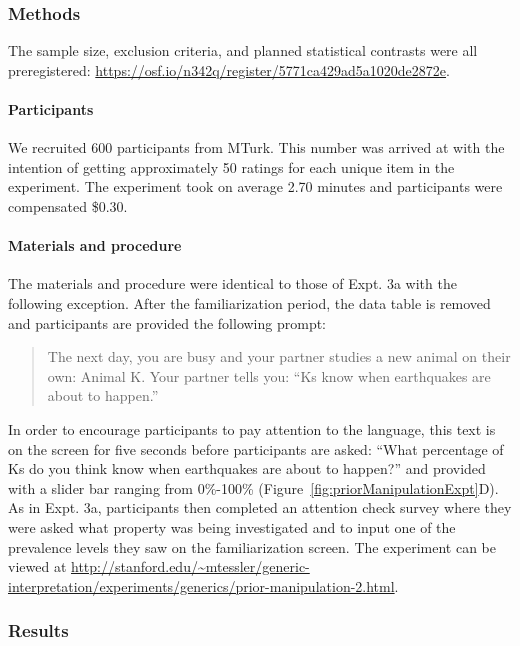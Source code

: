 \documentclass[floatsintext,man]{apa6}
\theoremstyle{definition}
\theoremstyle{definition}
\theoremstyle{definition}
\theoremstyle{remark}
\begin{document}
\subsubsection{Methods}\label{methods-3}

The sample size, exclusion criteria, and planned statistical contrasts
were all preregistered:
\url{https://osf.io/n342q/register/5771ca429ad5a1020de2872e}.

\paragraph{Participants}\label{participants-5}

We recruited 600 participants from MTurk. This number was arrived at
with the intention of getting approximately 50 ratings for each unique
item in the experiment. The experiment took on average 2.70 minutes and
participants were compensated \$0.30.

\paragraph{Materials and procedure}\label{materials-and-procedure}

The materials and procedure were identical to those of Expt. 3a with the
following exception. After the familiarization period, the data table is
removed and participants are provided the following prompt:

\begin{quote}
The next day, you are busy and your partner studies a new animal on
their own: Animal K. Your partner tells you: \enquote{Ks know when
earthquakes are about to happen.}
\end{quote}

In order to encourage participants to pay attention to the language,
this text is on the screen for five seconds before participants are
asked: \enquote{What percentage of Ks do you think know when earthquakes
are about to happen?} and provided with a slider bar ranging from
0\%-100\% (Figure~\ref{fig:priorManipulationExpt}D). As in Expt. 3a,
participants then completed an attention check survey where they were
asked what property was being investigated and to input one of the
prevalence levels they saw on the familiarization screen. The experiment
can be viewed at
\url{http://stanford.edu/~mtessler/generic-interpretation/experiments/generics/prior-manipulation-2.html}.

\subsubsection{Results}\label{results-4}
\end{document}
